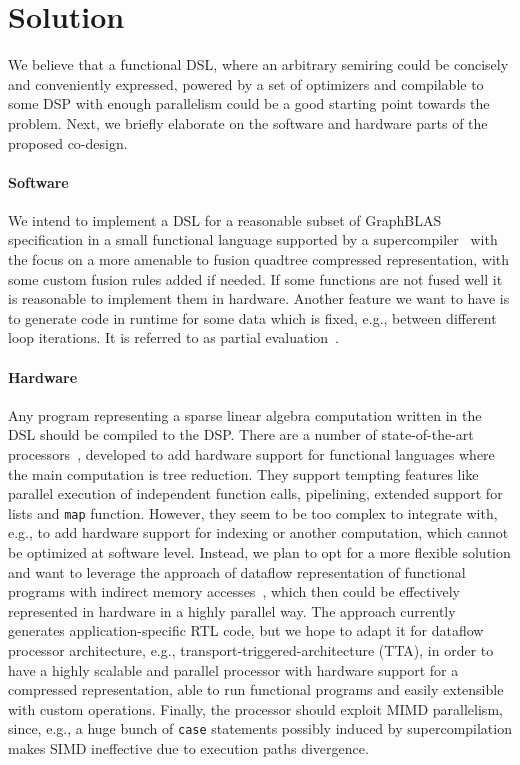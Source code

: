 \documentclass[sigplan,review,anonymous,nonacm]{acmart}\settopmatter{printfolios=true,printccs=false,printacmref=false}
\begin{document}
\section{Solution}
We believe that a functional DSL, where an arbitrary semiring
could be concisely and conveniently expressed, powered by a
set of optimizers  and  compilable  to  some  DSP  with  enough
parallelism could be a good starting point towards the problem.
Next, we briefly elaborate on the software and hardware parts of the proposed co-design. 
\paragraph{Software}
We intend to implement a DSL for a reasonable subset of GraphBLAS specification in a small functional language supported by a supercompiler~\cite{hosc}
with the focus on a more amenable to fusion quadtree compressed representation, with some custom fusion rules added if needed.
If some functions are not fused well it is reasonable to implement them in hardware. Another feature we want to have is to generate code in runtime for some data which is fixed, e.g., between different loop iterations.
It is referred to as partial evaluation~\cite{jones}.

\paragraph{Hardware}
Any program representing a sparse linear algebra computation written in the DSL should be compiled to the DSP.
There are a number of state-of-the-art processors~\cite{ACqua,PILGRIM,Reduceron}, developed to add hardware support for functional languages where the main computation is tree reduction.
They support tempting features like parallel execution of independent function calls, pipelining, extended support for lists and \texttt{map} function. 
However, they seem to be too complex to integrate with, e.g., to add hardware support for indexing or another computation, which cannot be optimized at software level.
Instead, we plan to opt for a more flexible solution and want to leverage the approach of dataflow representation of functional programs with indirect memory accesses~\cite{funcHLS}, which then could be effectively represented in hardware in a highly parallel way. 
The approach currently generates application-specific RTL code, but we hope to adapt it for dataflow processor architecture, e.g., transport-triggered-architecture (TTA), in order to have a highly scalable and parallel processor with hardware support for a compressed representation, able to run functional programs and easily extensible with custom operations.  
Finally, the processor should exploit MIMD parallelism, since, e.g., a huge bunch of \texttt{case} statements possibly induced by supercompilation makes SIMD ineffective due to execution paths divergence. 
\end{document}
